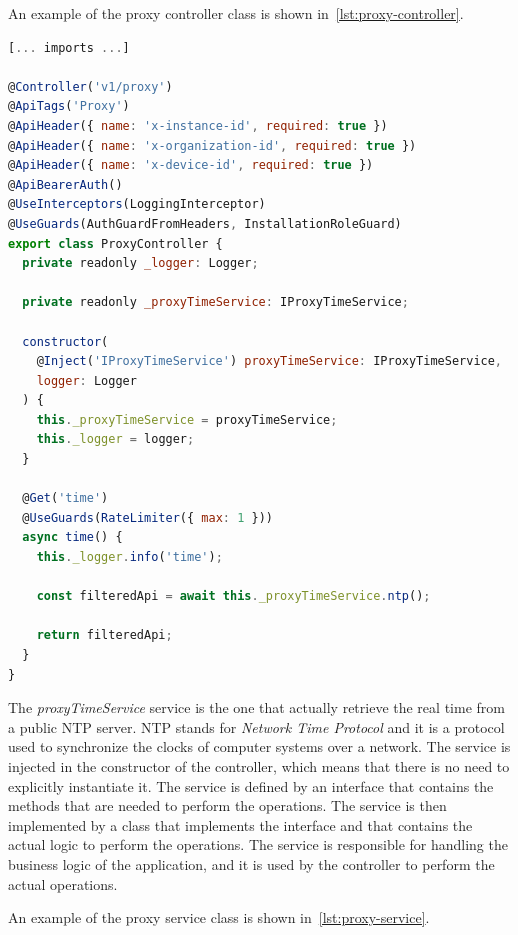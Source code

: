 An example of the proxy controller class is shown in~\cref{lst:proxy-controller}.

\begin{lstlisting}[language=Javascript, caption={Proxy controller class}, label={lst:proxy-controller}]
[... imports ...]

@Controller('v1/proxy')
@ApiTags('Proxy')
@ApiHeader({ name: 'x-instance-id', required: true })
@ApiHeader({ name: 'x-organization-id', required: true })
@ApiHeader({ name: 'x-device-id', required: true })
@ApiBearerAuth()
@UseInterceptors(LoggingInterceptor)
@UseGuards(AuthGuardFromHeaders, InstallationRoleGuard)
export class ProxyController {
  private readonly _logger: Logger;

  private readonly _proxyTimeService: IProxyTimeService;

  constructor(
    @Inject('IProxyTimeService') proxyTimeService: IProxyTimeService,
    logger: Logger
  ) {
    this._proxyTimeService = proxyTimeService;
    this._logger = logger;
  }

  @Get('time')
  @UseGuards(RateLimiter({ max: 1 }))
  async time() {
    this._logger.info('time');

    const filteredApi = await this._proxyTimeService.ntp();

    return filteredApi;
  }
}
\end{lstlisting}

The \textit{proxyTimeService} service is the one that actually retrieve the real time from a public NTP server. NTP stands for \textit{Network Time Protocol} and it is a protocol used to synchronize the clocks of computer systems over a network. The service is injected in the constructor of the controller, which means that there is no need to explicitly instantiate it. The service is defined by an interface that contains the methods that are needed to perform the operations. The service is then implemented by a class that implements the interface and that contains the actual logic to perform the operations. The service is responsible for handling the business logic of the application, and it is used by the controller to perform the actual operations.

An example of the proxy service class is shown in~\cref{lst:proxy-service}.

